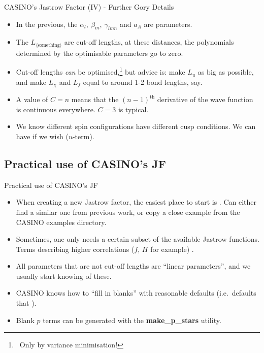 \documentclass[12pt, pdf, hyperref={draft}, usenames, dvipsnames,
aspectratio=169]{beamer}
\newcommand{\red}[1]{{\bf\color{LancsRed}{#1}}}
\newcommand{\blue}[1]{{\bf\color{NavyBlue}{#1}}}
\newcommand{\green}[1]{{\bf\color{ForestGreen}{#1}}}
\begin{document}
\begin{frame}{CASINO's Jastrow Factor (IV) - Further Gory Details}
\begin{itemize}
  \item In the previous, the $\alpha_l,\ \beta_m,\ \gamma_{lmn}$ and $a_A$ are
  \blue{optimisable} parameters.
  \item The $L_{\langle\text{something}\rangle}$ are cut-off lengths, at these
  distances, the polynomials determined by the optimisable parameters go
  \green{smoothly} to zero.
  \item Cut-off lengths \textit{can} be optimised,\footnote{\ Only by variance
  minimisation!} but advice is:
  make $L_u$ as big as possible,
  and make $L_\chi$ and $L_f$ equal to around 1-2 bond lengths, say.
  \item A value of $C=n$ means that the ${(n-1)}^{\text{th}}$ derivative of the
  wave function is continuous everywhere. $C=3$ is typical.
  \item We know different spin configurations have different cusp conditions.
  We can have \green{different parameters for each spin} if we wish ($u$-term).
\end{itemize}
\end{frame}


\subsection{Practical use of CASINO's JF}\label{sub:practical_use_of_casino_jf}

\begin{frame}{Practical use of CASINO's JF}

\begin{itemize}
  \item When creating a new Jastrow factor, the easiest place to start is
  \blue{with
  an existing one}. Can either find a similar one from previous work, or copy a
  close example from the CASINO examples directory.
  \item Sometimes, one only needs a certain subset of the available Jastrow
  functions. Terms describing higher correlations ($f$, $H$ for example)
  \red{don't usually change much}.
  \item All parameters that are not cut-off lengths are ``linear parameters'',
  and we usually start knowing \red{none} of these.
  \item CASINO knows how to ``fill in blanks'' with reasonable defaults (i.e.\
  defaults that \green{satisfy the cusp conditions}).
  \item Blank $p$ terms can be generated with the \textbf{make\_p\_stars} utility.
\end{itemize}
\end{frame}
\end{document}
